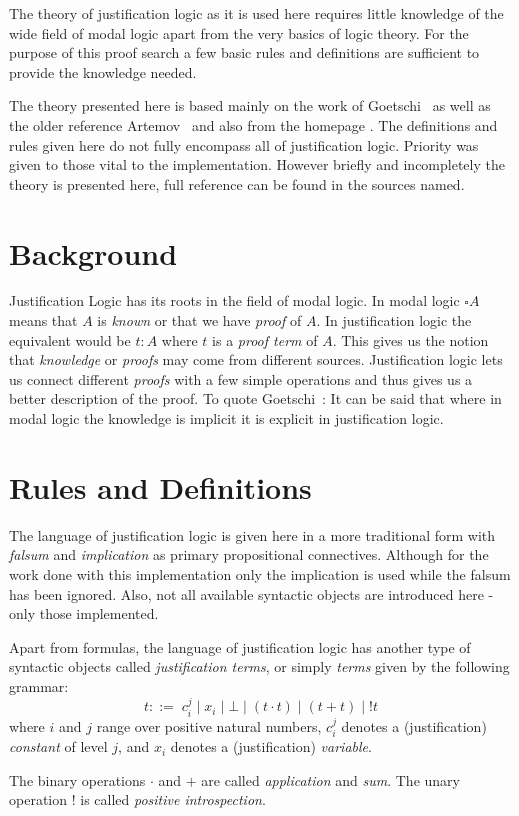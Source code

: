 The theory of justification logic as it is used here requires little knowledge of the wide field of modal logic apart from the very basics of logic theory. For the purpose of this proof search a few basic rules and definitions are sufficient to provide the knowledge needed. 

The theory presented here is based mainly on the work of Goetschi~\cite{goet} as well as the older reference Artemov~\cite{art} and also from the homepage  \cite{stan}. The definitions and rules given here do not fully encompass all of justification logic. Priority was given to those vital to the implementation. However briefly and incompletely the theory is presented here, full reference can be found in the sources named. 

\section{Background}
Justification Logic has its roots in the field of modal logic. 
In modal logic $\square A$ means that $A$ is \emph{known} or that we have \emph{proof} of $A$. In justification logic the equivalent would be $t:A$ where $t$ is a \emph{proof term} of $A$. This gives us the notion that \emph{knowledge} or \emph{proofs} may come from different sources. Justification logic lets us connect different \emph{proofs} with a few simple operations and thus gives us a better description of the proof. To quote Goetschi~\cite{goet}: It can be said that where in modal logic the knowledge is implicit it is explicit in justification logic.

\section{Rules and Definitions}

The language of justification logic is given here in a more traditional form with \emph{falsum} and \emph{implication} as primary propositional connectives. Although for the work done with this implementation only the implication is used while the falsum has been ignored. Also, not all available syntactic objects are introduced here - only those implemented.

\begin{definition}\label{justification_terms} Apart from formulas, the language of justification logic has another type of syntactic objects called \emph{justification terms}, or simply \emph{terms} given by the following grammar:
\[
	t::=  \;c_{i}^{j}\; |\; x_i \;|\; \bot \; |\; (t \cdot t)\; |\; (t+t)\; |\; !t
\]
where $i$ and $j$ range over positive natural numbers, $c_{i}^{j}$ denotes a (justification) \emph{constant} of level $j$, and $x_i$ denotes a (justification) \emph{variable}.

The binary operations $\cdot$ and $+$ are called \emph{application} and \emph{sum}. The unary operation $!$ is called \emph{positive introspection}.
\end{definition}

